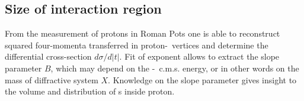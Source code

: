 \subsection{Size of interaction region}

From the measurement of protons in Roman Pots one is able to reconstruct squared four-momenta transferred in proton-\Pomeron\ vertices and determine the differential cross-section $d\sigma/d|t|$. Fit of exponent allows to extract the slope parameter $B$, which may depend on the \Pomeron-\Pomeron\ c.m.s. energy, or in other words on the mass of diffractive system $X$. Knowledge on the slope parameter gives insight to the volume and distribution of \Pomeron s inside proton.